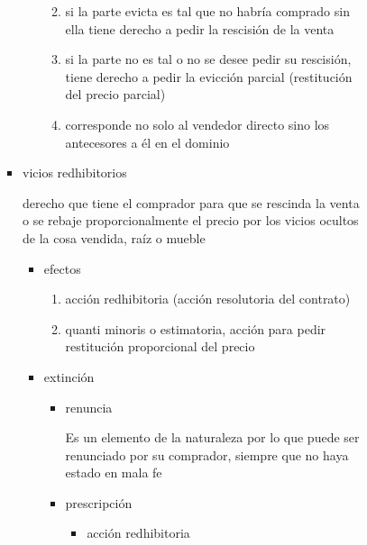 \documentclass[]{article}
\providecommand{\tightlist}{%
  \setlength{\itemsep}{0pt}\setlength{\parskip}{0pt}}
\begin{document}
\begin{itemize}
\begin{itemize}
\begin{itemize}
\begin{itemize}
\begin{itemize}
\begin{itemize}
            \begin{enumerate}
            \def\labelenumi{\arabic{enumi}.}
            \tightlist
            \item
              si la parte evicta es tal que no habría comprado sin ella
              tiene derecho a pedir la rescisión de la venta
            \item
              si la parte no es tal o no se desee pedir su rescisión,
              tiene derecho a pedir la evicción parcial (restitución del
              precio parcial)
            \item
              corresponde no solo al vendedor directo sino los
              antecesores a él en el dominio
            \end{enumerate}
          \end{itemize}
        \item
          vicios redhibitorios

          derecho que tiene el comprador para que se rescinda la venta o
          se rebaje proporcionalmente el precio por los vicios ocultos
          de la cosa vendida, raíz o mueble

          \begin{itemize}
          \tightlist
          \item
            efectos

            \begin{enumerate}
            \def\labelenumi{\arabic{enumi}.}
            \tightlist
            \item
              acción redhibitoria (acción resolutoria del contrato)
            \item
              quanti minoris o estimatoria, acción para pedir
              restitución proporcional del precio
            \end{enumerate}
          \item
            extinción

            \begin{itemize}
            \item
              renuncia

              Es un elemento de la naturaleza por lo que puede ser
              renunciado por su comprador, siempre que no haya estado en
              mala fe
            \item
              prescripción

              \begin{itemize}
              \tightlist
              \item
                acción redhibitoria


\end{itemize}
\end{itemize}
\end{itemize}
\end{itemize}
\end{itemize}
\end{itemize}
\end{itemize}
\end{itemize}
\end{document}
